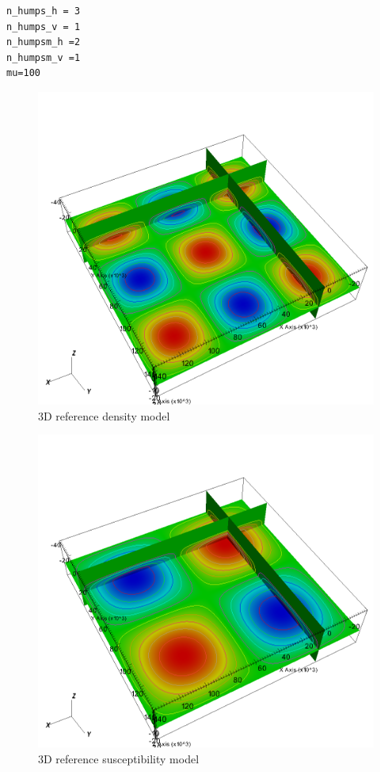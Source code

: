 \begin{verbatim}
n_humps_h = 3
n_humps_v = 1
n_humpsm_h =2
n_humpsm_v =1
mu=100
\end{verbatim}

\begin{figure}
\centering
\includegraphics[width=\textwidth]{joint3D4mag6grav-gref.png}
\caption{3D reference density model}

\end{figure}



\begin{figure}
\centering
\includegraphics[width=\textwidth]{joint3D4mag6grav-mref.png}
\caption{3D reference susceptibility model}

\end{figure}


